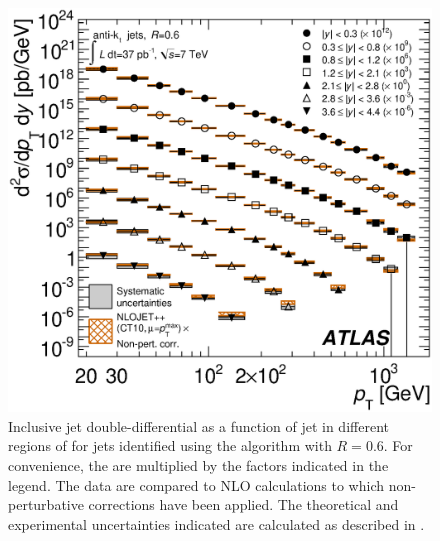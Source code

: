 \begin{figure}
  \includegraphics[width=\largefigwidth]{chapters/forward-inclusive/InclusivePtIDS_CT10_AntiKt06.eps}
  \caption{Inclusive jet double-differential \xs as a function of jet \pT in
    different regions of \absRap for jets identified using the \akt algorithm with
    $R=0.6$. For convenience, the  are multiplied by the factors indicated
    in the legend. The data are compared to NLO \pQCD calculations to which non-perturbative
    corrections have been applied. The theoretical and experimental uncertainties
    indicated are calculated as described in .}
  \label{fig:forward-inclusive:InclusiveCrossSectionAKT6}
\end{figure}

